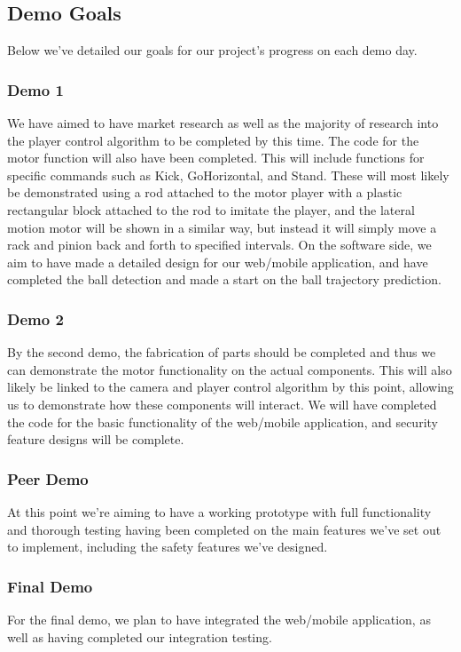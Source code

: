 \documentclass{article}
\begin{document}
\subsection{Demo Goals}
Below we've detailed our goals for our project's progress on each demo day.
\subsubsection{Demo 1}
We have aimed to have market research as well as the majority of research into the player control algorithm to be completed by this time. The code for the motor function will also have been completed. This will include functions for specific commands such as Kick, GoHorizontal, and Stand. These will most likely be demonstrated using a rod attached to the motor player with a plastic rectangular block attached to the rod to imitate the player, and the lateral motion motor will be shown in a similar way, but instead it will simply move a rack and pinion back and forth to specified intervals. On the software side, we aim to have made a detailed design for our web/mobile application, and have completed the ball detection and made a start on the ball trajectory prediction.

\subsubsection{Demo 2}
By the second demo, the fabrication of parts should be completed and thus we can demonstrate the motor functionality on the actual components. This will also likely be linked to the camera and player control algorithm by this point, allowing us to demonstrate how these components will interact. We will have completed the code for the basic functionality of the web/mobile application, and security feature designs will be complete. 

\subsubsection{Peer Demo} At this point we're aiming to have a working prototype with full functionality and thorough testing having been completed on the main features we've set out to implement, including the safety features we've designed. 

\subsubsection{Final Demo} For the final demo, we plan to have integrated the web/mobile application, as well as having completed our integration testing. 
\end{document}

